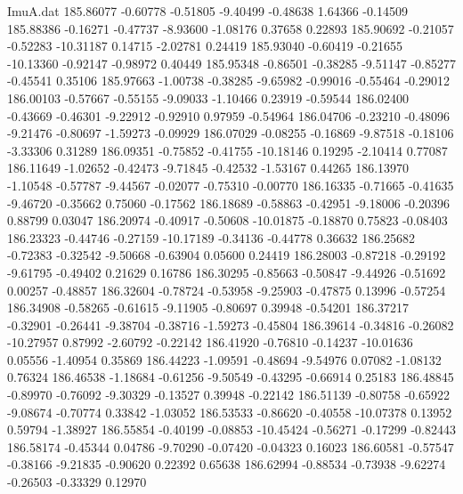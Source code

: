 \begin{filecontents}{ImuA.dat}
 185.86077   -0.60778   -0.51805   -9.40499   -0.48638    1.64366   -0.14509
 185.88386   -0.16271   -0.47737   -8.93600   -1.08176    0.37658    0.22893
 185.90692   -0.21057   -0.52283  -10.31187    0.14715   -2.02781    0.24419
 185.93040   -0.60419   -0.21655  -10.13360   -0.92147   -0.98972    0.40449
 185.95348   -0.86501   -0.38285   -9.51147   -0.85277   -0.45541    0.35106
 185.97663   -1.00738   -0.38285   -9.65982   -0.99016   -0.55464   -0.29012
 186.00103   -0.57667   -0.55155   -9.09033   -1.10466    0.23919   -0.59544
 186.02400   -0.43669   -0.46301   -9.22912   -0.92910    0.97959   -0.54964
 186.04706   -0.23210   -0.48096   -9.21476   -0.80697   -1.59273   -0.09929
 186.07029   -0.08255   -0.16869   -9.87518   -0.18106   -3.33306    0.31289
 186.09351   -0.75852   -0.41755  -10.18146    0.19295   -2.10414    0.77087
 186.11649   -1.02652   -0.42473   -9.71845   -0.42532   -1.53167    0.44265
 186.13970   -1.10548   -0.57787   -9.44567   -0.02077   -0.75310   -0.00770
 186.16335   -0.71665   -0.41635   -9.46720   -0.35662    0.75060   -0.17562
 186.18689   -0.58863   -0.42951   -9.18006   -0.20396    0.88799    0.03047
 186.20974   -0.40917   -0.50608  -10.01875   -0.18870    0.75823   -0.08403
 186.23323   -0.44746   -0.27159  -10.17189   -0.34136   -0.44778    0.36632
 186.25682   -0.72383   -0.32542   -9.50668   -0.63904    0.05600    0.24419
 186.28003   -0.87218   -0.29192   -9.61795   -0.49402    0.21629    0.16786
 186.30295   -0.85663   -0.50847   -9.44926   -0.51692    0.00257   -0.48857
 186.32604   -0.78724   -0.53958   -9.25903   -0.47875    0.13996   -0.57254
 186.34908   -0.58265   -0.61615   -9.11905   -0.80697    0.39948   -0.54201
 186.37217   -0.32901   -0.26441   -9.38704   -0.38716   -1.59273   -0.45804
 186.39614   -0.34816   -0.26082  -10.27957    0.87992   -2.60792   -0.22142
 186.41920   -0.76810   -0.14237  -10.01636    0.05556   -1.40954    0.35869
 186.44223   -1.09591   -0.48694   -9.54976    0.07082   -1.08132    0.76324
 186.46538   -1.18684   -0.61256   -9.50549   -0.43295   -0.66914    0.25183
 186.48845   -0.89970   -0.76092   -9.30329   -0.13527    0.39948   -0.22142
 186.51139   -0.80758   -0.65922   -9.08674   -0.70774    0.33842   -1.03052
 186.53533   -0.86620   -0.40558  -10.07378    0.13952    0.59794   -1.38927
 186.55854   -0.40199   -0.08853  -10.45424   -0.56271   -0.17299   -0.82443
 186.58174   -0.45344    0.04786   -9.70290   -0.07420   -0.04323    0.16023
 186.60581   -0.57547   -0.38166   -9.21835   -0.90620    0.22392    0.65638
 186.62994   -0.88534   -0.73938   -9.62274   -0.26503   -0.33329    0.12970

\end{filecontents}
